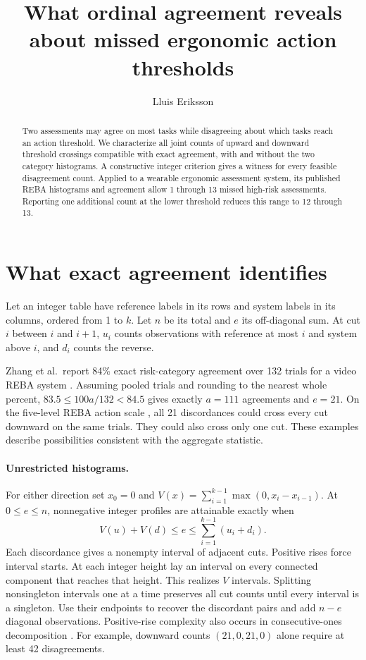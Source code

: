 \documentclass[11pt]{article}
\title{What ordinal agreement reveals about missed ergonomic action thresholds}
\author{Lluis Eriksson}
\date{}
\begin{document}
\maketitle
\begin{abstract}
Two assessments may agree on most tasks while disagreeing about which tasks reach an action threshold. We characterize all joint counts of upward and downward threshold crossings compatible with exact agreement, with and without the two category histograms. A constructive integer criterion gives a witness for every feasible disagreement count. Applied to a wearable ergonomic assessment system, its published REBA histograms and agreement allow 1 through 13 missed high-risk assessments. Reporting one additional count at the lower threshold reduces this range to 12 through 13.
\end{abstract}
\section{What exact agreement identifies}
Let an integer table have reference labels in its rows and system labels in its columns, ordered from 1 to $k$. Let $n$ be its total and $e$ its off-diagonal sum. At cut $i$ between $i$ and $i+1$, $u_i$ counts observations with reference at most $i$ and system above $i$, and $d_i$ counts the reverse.

Zhang et al.\ report 84\% exact risk-category agreement over 132 trials for a video REBA system \cite{zhang}. Assuming pooled trials and rounding to the nearest whole percent, $83.5\le 100a/132<84.5$ gives exactly $a=111$ agreements and $e=21$. On the five-level REBA action scale \cite{reba}, all 21 discordances could cross every cut downward on the same trials. They could also cross only one cut. These examples describe possibilities consistent with the aggregate statistic.

\paragraph{Unrestricted histograms.} For either direction set $x_0=0$ and $V(x)=\sum_{i=1}^{k-1}\max(0,x_i-x_{i-1})$. At $0\le e\le n$, nonnegative integer profiles are attainable exactly when
\[
 V(u)+V(d)\le e\le\sum_{i=1}^{k-1}(u_i+d_i).
\]
Each discordance gives a nonempty interval of adjacent cuts. Positive rises force interval starts. At each integer height lay an interval on every connected component that reaches that height. This realizes $V$ intervals. Splitting nonsingleton intervals one at a time preserves all cut counts until every interval is a singleton. Use their endpoints to recover the discordant pairs and add $n-e$ diagonal observations. Positive-rise complexity also occurs in consecutive-ones decomposition \cite{segments}. For example, downward counts $(21,0,21,0)$ alone require at least 42 disagreements.
\end{document}
